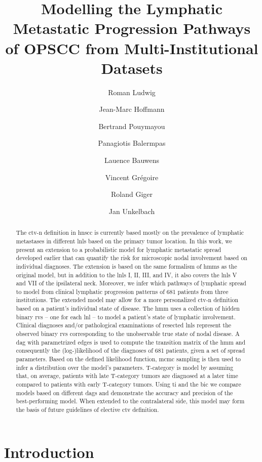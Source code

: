 \documentclass[twocolumn]{aastex631}
\begin{document}
\title{Modelling the Lymphatic Metastatic Progression Pathways of OPSCC from Multi-Institutional Datasets}

\author{Roman Ludwig}
\author{Jean-Marc Hoffmann}
\author{Bertrand Pouymayou}
\author{Panagiotis Balermpas}
\author{Lauence Bauwens}
\author{Vincent Grégoire}
\author{Roland Giger}
\author{Jan Unkelbach}

\begin{abstract}
    The \gls{ctv-n} definition in \gls{hnscc} is currently based mostly on the prevalence of lymphatic metastases in different \glspl{lnl} based on the primary tumor location. In this work, we present an extension to a probabilistic model for lymphatic metastatic spread developed earlier that can quantify the risk for microscopic nodal involvement based on individual diagnoses. The extension is based on the same formalism of \glspl{hmm} as the original model, but in addition to the \glspl{lnl} I, II, III, and IV, it also covers the \glspl{lnl} V and VII of the ipsilateral neck. Moreover, we infer which pathways of lymphatic spread to model from clinical lymphatic progression patterns of 681 patients from three institutions. The extended model may allow for a more personalized \gls{ctv-n} definition based on a patient's individual state of disease. The \gls{hmm} uses a collection of hidden binary \glspl{rv} -- one for each \gls{lnl} -- to model a patient's state of lymphatic involvement. Clinical diagnoses and/or pathological examinations of resected \glspl{lnl} represent the observed binary \glspl{rv} corresponding to the unobservable true state of nodal disease. A \gls{dag} with parametrized edges is used to compute the transition matrix of the \gls{hmm} and consequently the (log-)likelihood of the diagnoses of 681 patients, given a set of spread parameters. Based on the defined likelihood function, \gls{mcmc} sampling is then used to infer a distribution over the model's parameters. T-category is model by assuming that, on average, patients with late T-category tumors are diagnosed at a later time compared to patients with early T-category tumors. Using \gls{ti} and the \gls{bic} we compare models based on different \glspl{dag} and demonstrate the accuracy and precision of the best-performing model. When extended to the contralateral side, this model may form the basis of future guidelines of elective \gls{ctv} definition.
\end{abstract}

\section{Introduction}
\label{sec:intro}
\end{document}
